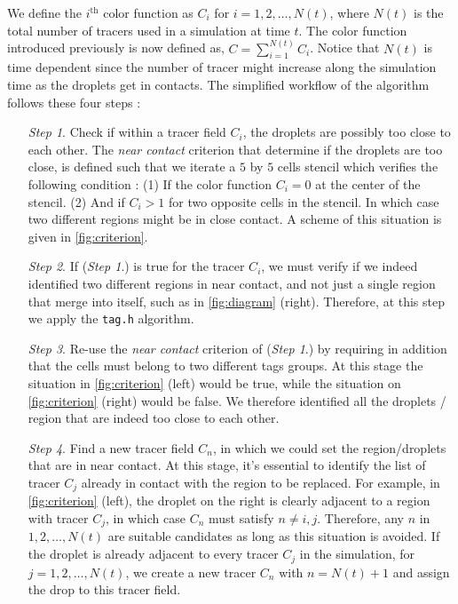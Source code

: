 We define the $i^\text{th}$ color function as $C_i$ for $i =1,2,\ldots,N(t)$, where $N(t)$ is the total number of tracers used in a simulation at time $t$.
The color function introduced previously is now defined as, $C = \sum_{i=1}^{N(t)} C_i$. 
Notice that $N(t)$ is time dependent since the number of tracer might increase along the simulation time as the droplets get in contacts. 
The simplified workflow of the algorithm follows these four steps : 
\begin{enumerate}
    \item[\textit{Step 1}.] Check if within a tracer field $C_i$, the droplets are possibly too close to each other. 
    The \textit{near contact} criterion that determine if the droplets are too close, is defined such that we iterate a $5$ by $5$ cells stencil which verifies the following condition : 
    (1) If the color function $C_i = 0$ at the center of the stencil. 
    (2) And if $C_i > 1$ for two opposite cells in the stencil. 
    In which case two different regions might be in close contact.
    A scheme of this situation is given in \ref{fig:criterion}.  
    \item[\textit{Step 2}.] 
    If (\textit{Step 1}.) is true for the tracer $C_i$, we must verify if we indeed identified two different regions in near contact, and not just a single region that merge into itself, such as in \ref{fig:diagram} (right). 
    Therefore, at this step  we apply the \texttt{tag.h} algorithm.
    \item[\textit{Step 3}.] Re-use the \textit{near contact} criterion of (\textit{Step 1}.) by requiring in addition that the cells must belong to two different tags groups. 
    At this stage the situation in \ref{fig:criterion} (left) would be true, while the situation on \ref{fig:criterion} (right) would be false. 
    We therefore identified all the droplets / region that are indeed too close to each other. 
    \item[\textit{Step 4}.] 
    Find a new tracer field $C_n$, in which we could set the region/droplets that are in near contact. 
    At this stage, it's essential to identify the list of tracer $C_j$ already in contact with the region to be replaced. 
    For example, in \ref{fig:criterion} (left), the droplet on the right is clearly adjacent to a region with tracer $C_j$, in which case $C_n$ must satisfy $n \neq i,j$. 
    Therefore, any $n$ in $1, 2, \ldots, N(t)$ are suitable candidates as long as this situation is avoided. 
    If the droplet is already adjacent to every tracer $C_j$ in the simulation, for $j = 1, 2, \ldots, N(t)$, we create a new tracer $C_n$ with $n = N(t)+1$ and assign the drop to this tracer field.
\end{enumerate}
